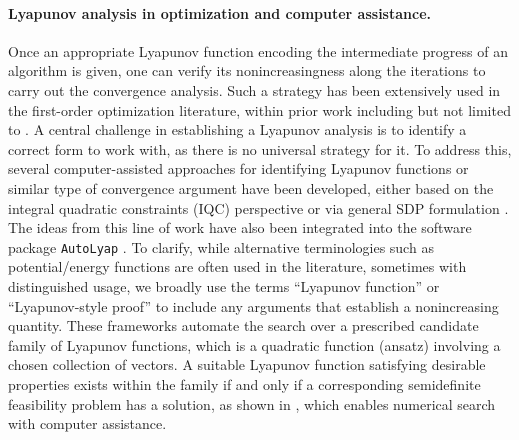 \documentclass{article}
\theoremstyle{definition}
\theoremstyle{plain}
\begin{document}
\paragraph{Lyapunov analysis in optimization and computer assistance.} 
Once an appropriate Lyapunov function encoding the intermediate progress of an algorithm is given, one can verify its nonincreasingness along the iterations to carry out the convergence analysis.
Such a strategy has been extensively used in the first-order optimization literature, within prior work including but not limited to \cite{Nesterov1983_method, 
VanScoyFreemanLynch2018_fastest, 
BansalGupta2019_potentialfunction, TaylorBach2019_stochastic, dAspremontScieurTaylor2021_acceleration, YoonRyu2021_accelerated, LeeKim2021_fast, LeeParkRyu2021_geometric, DiakonikolasWang2022_potential, ParkRyu2022_exact, KimOzdaglarParkRyu2023_timereversed,  ParkRyu2024_optimal, YoonKimSuhRyu2024_optimal, yoonAcceleratedMinimaxAlgorithms2025,JangGuptaRyu2025_computerassisted}.
A central challenge in establishing a Lyapunov analysis is to identify a correct form to work with, as there is no universal strategy for it.
To address this, several computer-assisted approaches for identifying Lyapunov functions or similar type of convergence argument have been developed, either based on the integral quadratic constraints (IQC) perspective \citep{lessardAnalysisDesignOptimization2016, TaylorVanScoyLessard2018_lyapunov} or via general SDP formulation \citep{TaylorVanScoyLessard2018_lyapunov, TaylorBach2019_stochastic, UpadhyayaBanertTaylorGiselsson2025_automated}.
The ideas from this line of work have also been integrated into the software package \texttt{AutoLyap} \citep{UpadhyayaGuptaTaylorBanertGiselsson2026_autolyap}. 
To clarify, while alternative terminologies such as potential/energy functions are often used in the literature, sometimes with distinguished usage, we broadly use the terms ``Lyapunov function'' or ``Lyapunov-style proof'' to include any arguments that establish a nonincreasing quantity.
These frameworks automate the search over a prescribed candidate family of Lyapunov functions, which is a quadratic function (ansatz) involving a chosen collection of vectors.
A suitable Lyapunov function satisfying desirable properties exists within the family if and only if a corresponding semidefinite feasibility problem has a solution, as shown in \cite{UpadhyayaBanertTaylorGiselsson2025_automated}, which enables numerical search with computer assistance.
\end{document}
